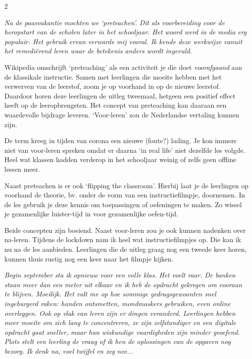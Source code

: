 \begin{multicols}{2}

\emph{Na de paasvakantie mochten we `preteachen'. Dit als voorbereiding voor de heropstart van de scholen later in het schooljaar. Het woord werd in de media erg populair. Het gebruik ervan verwarde mij vooral. Ik kende deze werkwijze vanuit het remediërend leren waar de betekenis anders wordt ingevuld.}

Wikipedia omschrijft `preteaching' als een activiteit je die doet \emph{voorafgaand} aan de klassikale instructie. Samen met leerlingen die moeite hebben met het verwerven van de leerstof, zoom je op voorhand in op de nieuwe leerstof. Daardoor horen deze leerlingen de uitleg tweemaal, hetgeen een positief effect heeft op de leeropbrengsten. Het concept van preteaching kan daaraan een waardevolle bijdrage leveren. `Voor-leren' zou de Nederlandse vertaling kunnen zijn. 

De term kreeg in tijden van corona een nieuwe (foute?) lading. Je kon immers niet van voor-leren spreken omdat er daarna `in real life' niet dezelfde les volgde. Heel wat klassen hadden verderop in het schooljaar weinig of zelfs geen offline lessen meer. 

Naast preteachen is er ook `flipping the classroom'. Hierbij laat je de leerlingen op voorhand de theorie, bv. onder de vorm van een instructiefilmpje, doornemen. In de les gebruik je deze kennis om toepassingen of oefeningen te maken. Zo wissel je gezamenlijke luister-tijd in voor gezamenlijke oefen-tijd.

Beide concepten zijn boeiend. Naast voor-leren zou je ook kunnen nadenken over na-leren. Tijdens de lockdown nam ik heel wat instructiefilmpjes op. Die kan ik nu na de les aanbieden. Leerlingen die de uitleg graag nog een tweede keer horen, kunnen thuis rustig nog een keer naar het filmpje kijken. 


\emph{Begin september sta ik opnieuw voor een volle klas. Het voelt raar. De banken staan meer dan een meter uit elkaar en ik heb de opdracht gekregen om vooraan te blijven. Moeilijk. Het valt me op hoe sommige gedragsgewoonten snel ingeburgerd raken: handen ontsmetten, mondmaskers gebruiken, even online overleggen. Ook op vlak van leren zijn er dingen veranderd. Leerlingen hebben meer moeite om zich lang te concentreren, ze zijn zelfstandiger en een digitale opdracht gaat sneller, maar hun wiskundige vaardigheden zijn minder geoefend. Plots stelt een leerling de vraag of ik hen de oplossingen van de opgaven nog bezorg. Ik denk na, voel twijfel en zeg nee...}


\end{multicols}

